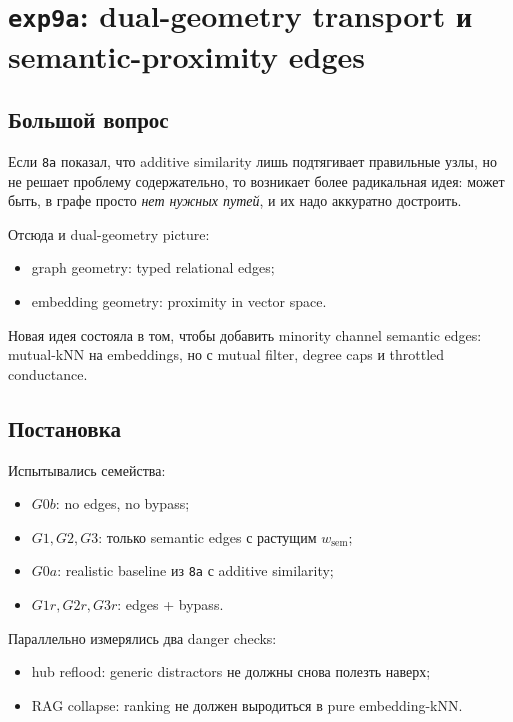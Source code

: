 \section{\texttt{exp9a}: dual-geometry transport и semantic-proximity edges}

\subsection{Большой вопрос}

Если \texttt{8a} показал, что additive similarity лишь подтягивает правильные
узлы, но не решает проблему содержательно, то возникает более радикальная идея:
может быть, в графе просто \emph{нет нужных путей}, и их надо аккуратно
достроить.

Отсюда и dual-geometry picture:

\begin{itemize}[leftmargin=2em]
\item graph geometry: typed relational edges;
\item embedding geometry: proximity in vector space.
\end{itemize}

Новая идея состояла в том, чтобы добавить minority channel semantic edges:
mutual-kNN на embeddings, но с mutual filter, degree caps и throttled
conductance.

\subsection{Постановка}

Испытывались семейства:

\begin{itemize}[leftmargin=2em]
\item \(G0b\): no edges, no bypass;
\item \(G1,G2,G3\): только semantic edges с растущим \(w_{\mathrm{sem}}\);
\item \(G0a\): realistic baseline из \texttt{8a} с additive similarity;
\item \(G1r,G2r,G3r\): edges + bypass.
\end{itemize}

Параллельно измерялись два danger checks:

\begin{itemize}[leftmargin=2em]
\item hub reflood: generic distractors не должны снова полезть наверх;
\item RAG collapse: ranking не должен выродиться в pure embedding-kNN.
\end{itemize}

